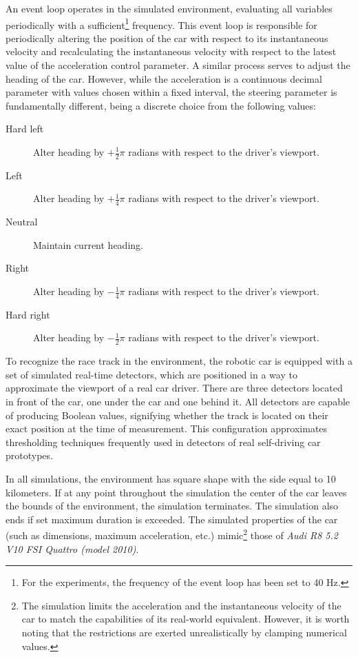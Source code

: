 An event loop operates in the simulated environment, evaluating all variables periodically with a sufficient\footnote{For the experiments, the frequency of the event loop has been set to 40 Hz.} frequency. This event loop is responsible for periodically altering the position of the car with respect to its instantaneous velocity and recalculating the instantaneous velocity with respect to the latest value of the acceleration control parameter. A similar process serves to adjust the heading of the car. However, while the acceleration is a continuous decimal parameter with values chosen within a fixed interval, the steering parameter is fundamentally different, being a discrete choice from the following values:
~
\begin{description}
	\item[Hard left]
	Alter heading by $+\frac{1}{2}\pi$ radians with respect to the driver's viewport.

	\item[Left]
	Alter heading by $+\frac{1}{4}\pi$ radians with respect to the driver's viewport.

	\item[Neutral]
	Maintain current heading.

	\item[Right]
	Alter heading by $-\frac{1}{4}\pi$ radians with respect to the driver's viewport.

	\item[Hard right]
	Alter heading by $-\frac{1}{2}\pi$ radians with respect to the driver's viewport.
\end{description}

To recognize the race track in the environment, the robotic car is equipped with a set of simulated real-time detectors, which are positioned in a way to approximate the viewport of a real car driver. There are three detectors located in front of the car, one under the car and one behind it. All detectors are capable of producing Boolean values, signifying whether the track is located on their exact position at the time of measurement. This configuration approximates thresholding techniques frequently used in detectors of real self-driving car prototypes.

In all simulations, the environment has square shape with the side equal to 10 kilometers. If at any point throughout the simulation the center of the car leaves the bounds of the environment, the simulation terminates. The simulation also ends if set maximum duration is exceeded. The simulated properties of the car (such as dimensions, maximum acceleration, etc.) mimic\footnote{The simulation limits the acceleration and the instantaneous velocity of the car to match the capabilities of its real-world equivalent. However, it is worth noting that the restrictions are exerted unrealistically by clamping numerical values.} those of \textit{Audi R8 5.2 V10 FSI Quattro (model 2010)}.

